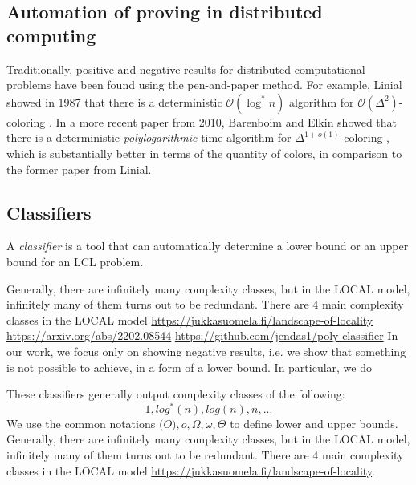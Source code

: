 \subsection{Automation of proving in distributed computing} \label{sec:prior_work:title_b}
Traditionally, positive and negative results for distributed computational problems have been found using the pen-and-paper method.
For example, Linial showed in 1987 that there is a deterministic \(\mathcal{O}(\log^* n)\) algorithm for \(\mathcal{O}(\Delta^2)\)-coloring \cite{DBLP:conf/focs/Linial87}.
In a more recent paper from 2010, Barenboim and Elkin showed that there is a deterministic \emph{polylogarithmic} time algorithm for \(\Delta^{1 + o(1)}\)-coloring \cite{DBLP:conf/podc/BarenboimE10}, which is substantially better in terms of the quantity of colors, in comparison to the former paper \cite{DBLP:conf/focs/Linial87} from Linial.
\subsection{Classifiers} \label{sec:prior_work:title_c}


A \emph{classifier} is a tool that can automatically determine a lower bound or an upper bound for an LCL problem.


Generally, there are infinitely many complexity classes, but in the LOCAL model, infinitely many of them turns out to be redundant.
There are 4 main complexity classes in the LOCAL model \url{https://jukkasuomela.fi/landscape-of-locality}
\url{https://arxiv.org/abs/2202.08544}
\url{https://github.com/jendas1/poly-classifier}
In our work, we focus only on showing negative results, i.e. we show that something is not possible to achieve, in a form of a lower bound.
In particular, we do

These classifiers generally output complexity classes of the following:
\[1, log^*(n), log(n), n, ...\]
\todo{}
We use the common notations \(\mathcal(O), o, \Omega, \omega, \Theta \) to define lower and upper bounds.
Generally, there are infinitely many complexity classes, but in the LOCAL model, infinitely many of them turns out to be redundant.
There are 4 main complexity classes in the LOCAL model \url{https://jukkasuomela.fi/landscape-of-locality}.

